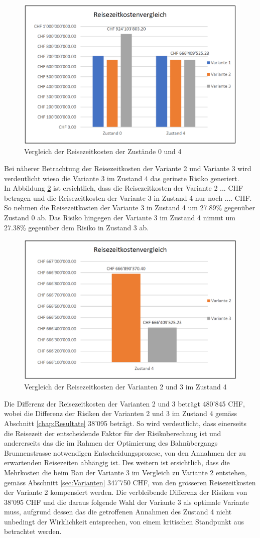 \begin{figure}[h!]
	\centering
	\includegraphics[width=.45\textwidth]{figures/f-06-06-ReisezeitVergleichZ0-Z4}
	\caption[Reisezeitkostenvergleich Zustand 0 und 4]{Vergleich der Reisezeitkosten der Zustände 0 und 4}
	\label{img:ReisezeitkostenZ0-Z4}
\end{figure} 

Bei näherer Betrachtung der Reisezeitkosten der Variante 2 und Variante 3 wird verdeutlicht wieso die Variante 3 im Zustand 4 das gerinste Risiko generiert. \\
In Abbildung \ref{img:ReisezeitkostenV2-V3-Z4} ist ersichtlich, dass die Reisezeitkosten der Variante 2 ... CHF betragen und die Reisezeitkosten der Variante 3 in Zustand 4 nur noch .... CHF. So nehmen die Reisezeitkosten der Variante 3 in Zustand 4 um 27.89\% gegenüber Zustand 0 ab. Das Risiko hingegen der Variante 3 im Zustand 4 nimmt um 27.38\% gegenüber dem Risiko in Zustand 3 ab.

\begin{figure}[h!]
	\centering
	\includegraphics[width=.45\textwidth]{figures/f-06-07-ReisezeitVergleichV2_V3-Z0}
	\caption[Reisezeitkostenvergleich Variante 2 und 3 in Zustand 4]{Vergleich der Reisezeitkosten der Varianten 2 und 3 im Zustand 4}
	\label{img:ReisezeitkostenV2-V3-Z4}
\end{figure} 

Die Differenz der Reisezeitkosten der Varianten 2 und 3 beträgt 480'845 CHF, wobei die Differenz der Risiken der Varianten 2 und 3 im Zustand 4 gemäss Abschnitt \ref{chap:Resultate} 38'095 beträgt. So wird verdeutlicht, dass einerseits die Reisezeit der entscheidende Faktor für der Risikoberechnug ist und andererseits das die im Rahmen der Optimierung des Bahnübergangs Brunnenstrasse notwendigen Entscheidungsprozese, von den Annahmen der zu erwartenden Reisezeiten abhängig ist.
Des weitern ist ersichtlich, dass die Mehrkosten die beim Bau der Variante 3 im Vergleich zu Variante 2 entstehen, gemäss Abschnitt \ref{sec:Varianten} 347'750 CHF, von den grösseren Reisezeitkosten der Variante 2 kompensiert werden. Die verbleibende Differenz der Risiken von 38'095 CHF und die daraus folgende Wahl der Variante 3 als optimale Variante muss, aufgrund dessen das die getroffenen Annahmen des Zustand 4 nicht unbedingt der Wirklichkeit entsprechen, von einem kritischen Standpunkt aus betrachtet werden.

